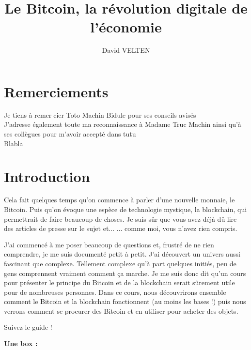 \documentclass{bredele} %
\title{Le Bitcoin, la révolution digitale de l'économie}
\author{David VELTEN}
\begin{document}
    \maketitle

    \clearemptydoublepage
    \chapter*{Remerciements}
    \thispagestyle{empty}
    Je tiens à remercier Toto Machin Bidule pour ses conseils avisés \\
    J'adresse également toute ma reconnaissance à Madame Truc Machin ainsi qu'à ses collègues pour m'avoir accepté dans tutu \\
    Blabla

    \frontmatter
    \chapter*{Introduction}

    Cela fait quelques temps qu'on commence à parler d'une nouvelle monnaie, le Bitcoin. Puis qu'on évoque une espèce de technologie mystique, la blockchain, qui permettrait de faire beaucoup de choses. Je suis sûr que vous avez déjà dû lire des articles de presse sur le sujet et...
    ... comme moi, vous n'avez rien compris.


    J'ai commencé à me poser beaucoup de questions et, frustré de ne rien comprendre, je me suis documenté petit à petit. J'ai découvert un univers aussi fascinant que complexe. Tellement complexe qu'à part quelques initiés, peu de gens comprennent vraiment comment ça marche. Je me suis donc dit qu'un cours pour présenter le principe du Bitcoin et de la blockchain serait sûrement utile pour de nombreuses personnes. Dans ce cours, nous découvrirons ensemble comment le Bitcoin et la blockchain fonctionnent (au moins les bases !) puis nous verrons comment se procurer des Bitcoin et en utiliser pour acheter des objets.

    Suivez le guide !

    \textbf{Une box : }

\end{document}
